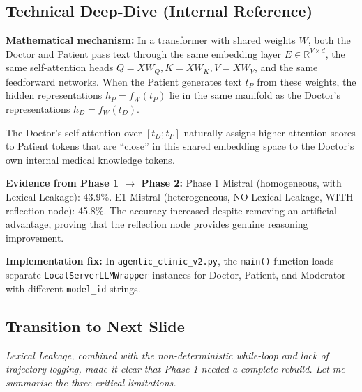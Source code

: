 \documentclass[12pt]{article}
\begin{document}
  \subsection*{Technical Deep-Dive (Internal Reference)}
  {\color{techgray}
  \textbf{Mathematical mechanism:} In a transformer with shared weights $W$, both the Doctor and Patient pass text through the same embedding layer $E \in \mathbb{R}^{V \times d}$, the same self-attention heads $Q = XW_Q, K = XW_K, V = XW_V$, and the same feedforward networks. When the Patient generates text $t_P$ from these weights, the hidden representations $h_P = f_W(t_P)$ lie in the same manifold as the Doctor's representations $h_D = f_W(t_D)$.

  The Doctor's self-attention over $[t_D; t_P]$ naturally assigns higher attention scores to Patient tokens that are ``close'' in this shared embedding space to the Doctor's own internal medical knowledge tokens.

  \textbf{Evidence from Phase 1 $\to$ Phase 2:} Phase 1 Mistral (homogeneous, with Lexical Leakage): 43.9\%. E1 Mistral (heterogeneous, NO Lexical Leakage, WITH reflection node): 45.8\%. The accuracy increased despite removing an artificial advantage, proving that the reflection node provides genuine reasoning improvement.

  \textbf{Implementation fix:} In \texttt{agentic\_clinic\_v2.py}, the \texttt{main()} function loads separate \texttt{LocalServerLLMWrapper} instances for Doctor, Patient, and Moderator with different \texttt{model\_id} strings.
  }

  \subsection*{Transition to Next Slide}
  {\color{transgreen}
  \textit{Lexical Leakage, combined with the non-deterministic while-loop and lack of trajectory logging, made it clear that Phase 1 needed a complete rebuild. Let me summarise the three critical limitations.}
  }
\end{document}
